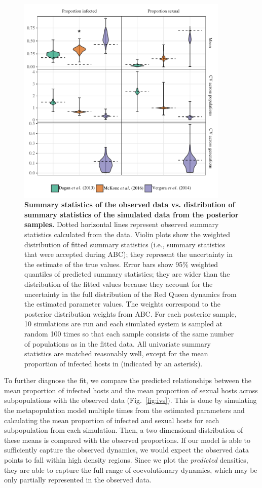 \documentclass{article}\usepackage[]{graphicx}\usepackage[]{color}
\newcommand{\fref}[1]{Fig.~\ref{fig:#1}}
\begin{document}
\begin{figure}[!ht]
\includegraphics[width=0.9\textwidth]{../fig/smc_summary.pdf}
\caption{{\bf Summary statistics of the observed data vs. distribution of summary statistics of the simulated data from the posterior samples.}
Dotted horizontal lines represent observed summary statistics calculated from the data.
Violin plots show the weighted distribution of fitted summary statistics (i.e., summary statistics that were accepted during ABC);
they represent the uncertainty in the estimate of the true values.
Error bars show 95\% weighted quantiles of predicted summary statistics;
they are wider than the distribution of the fitted values because they account for the uncertainty in the full distribution of the Red Queen dynamics from the estimated parameter values.
The weights correspond to the posterior distribution weights from ABC.
For each posterior sample, 10 simulations are run and each simulated system is sampled at random 100 times so that each sample consists of the same number of populations as in the fitted data.
All univariate summary statistics are matched reasonably well, except for the mean proportion of infected hosts in \cite{mckone2016fine} (indicated by an asterisk). 
}
\label{fig:smcsumm}
\end{figure}

To further diagnose the fit, we compare the predicted relationships between the mean proportion of infected hosts and the mean proportion of sexual hosts across subpopulations with the observed data (\fref{ivs}).
This is done by simulating the metapopulation model multiple times from the estimated parameters and calculating the mean proportion of infected and sexual hosts for each subpopulation from each simulation.
Then, a two dimensional distribution of these means is compared with the observed proportions.
If our model is able to sufficiently capture the observed dynamics, we would expect the observed data points to fall within high density regions.
Since we plot the \emph{predicted} densities, they are able to capture the full range of coevolutionary dynamics, which may be only partially represented in the observed data.
\end{document}
